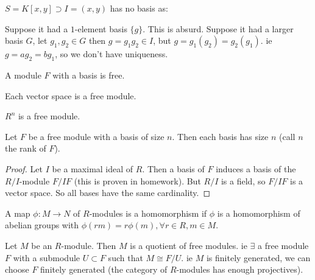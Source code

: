 \begin{nexample}
$S = K [ x,y] \supset I = (x,y) $ has no basis as:

Suppose it had a $1$-element basis $\{g \}$. This is absurd.
Suppose it had a larger basis $G$, let $g_1, g_2 \in G$ then $g = g_1 g_2 \in I$, but $g = g_1 (g_2) = g_2 (g_1)$. ie $g = a g_2 = bg_1$, so we don't have uniqueness.
\end{nexample}

\begin{definition}
A module $F$ with a basis is free.
\end{definition}

\begin{example}
Each vector space is a free module.
\end{example}

\begin{example}
$R^n$ is a free module.
\end{example}

\begin{lemma}
Let $F$ be a free module with a basis of size $n$. Then each basis has size $n$ (call $n$ the rank of $F$).
\end{lemma}

\begin{proof}
Let $I$ be a maximal ideal of $R$. Then a basis of $F$ induces a basis of the $R/I$-module $F/IF$ (this is proven in homework).
But $R/I$ is a field, so $F/IF$ is a vector space. So all bases have the same cardinality.
\end{proof}

\begin{definition}
A map $\phi: M \to N$ of $R$-modules is a homomorphism if $\phi$ is a homomorphism of abelian groups with $\phi(rm) = r \phi(m), \forall r \in R, m \in M$.
\end{definition}

\begin{proposition}
Let $M $ be an $R$-module. Then $M$ is a quotient of free modules. ie $\exists $ a free module $F$ with a submodule $U \subset F$ such that $M \cong F/U$. ie $M$ is finitely generated, we can choose $F$ finitely generated (the category of $R$-modules has enough projectives).
\end{proposition}

